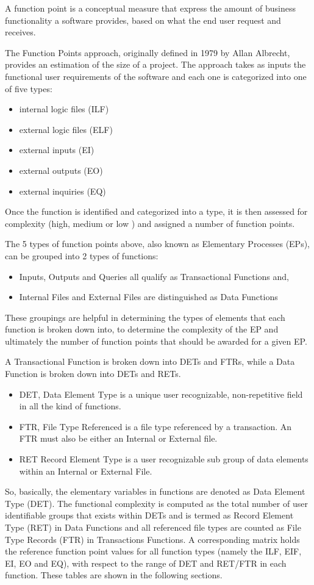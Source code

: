 A function point is a conceptual measure that express the amount of business functionality a software provides, based on what the end user request and receives.

The Function Points approach, originally defined in 1979 by Allan Albrecht, provides an estimation of the size of a project.  The approach takes as inputs the functional user requirements of the software and each one is categorized into one of five types:
\begin{itemize}
	\item internal logic files (ILF) 
	\item external logic files (ELF)
	\item external inputs (EI)
	\item external outputs (EO)
	\item external inquiries (EQ)
\end{itemize} 
Once the function is identified and categorized into a type, it is then assessed for complexity (high, medium or low ) and assigned a number of function points. 

The 5 types of function points above, also known as Elementary Processes (EPs), can be grouped into 2 types of functions:

\begin{itemize}
	\item Inputs, Outputs and Queries all qualify as Transactional Functions and,
	\item Internal Files and External Files are distinguished as Data Functions
\end{itemize}

These groupings are helpful in determining the types of elements that each function is broken down into, to determine the complexity of the EP and ultimately the number of function points that should be awarded for a given EP.

A Transactional Function is broken down into DETs and FTRs, while a Data Function is broken down into DETs and RETs.

\begin{itemize}
	\item DET, Data Element Type is a unique user recognizable, non-repetitive field in all the kind of functions.
	\item FTR, File Type Referenced is a file type referenced by a transaction. An FTR must also be either an Internal or External file.
	\item RET Record Element Type is a user recognizable sub group of data elements within an Internal or External File.
\end{itemize}
So, basically, the elementary variables in functions are denoted as Data Element Type (DET). The functional complexity is computed as the total number of user identifiable groups that exists within DETs and is termed as Record Element Type (RET) in Data Functions and all referenced file types are counted as File Type Records (FTR) in Transactions Functions. 
A corresponding matrix holds the reference function point values for all function types (namely the ILF, EIF, EI, EO and EQ), with respect to the range of DET and RET/FTR in each function. These tables are shown in the following sections.

